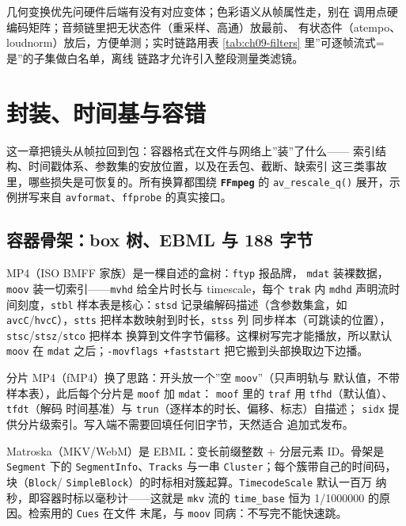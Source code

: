 \documentclass[12pt,a4paper,fontset=fandol]{ctexbook}
\newcommand{\Fn}[1]{\texttt{#1()}}
\newcommand{\Tp}[1]{\texttt{#1}}
\newcommand{\Bk}{\discretionary{}{}{}}
\newcommand{\Lib}[1]{\textbf{\texttt{#1}}}
\begin{document}
\begin{bestpractice}[title={管线选型速查}]
  几何变换优先问硬件后端有没有对应变体；色彩语义从帧属性走，别在
  调用点硬编码矩阵；音频链里把无状态件（重采样、高通）放最前、
  有状态件（atempo、loudnorm）放后，方便单测；实时链路用表
  \ref{tab:ch09-filters} 里''可逐帧流式=是''的子集做白名单，离线
  链路才允许引入整段测量类滤镜。
\end{bestpractice}

\chapter{封装、时间基与容错}
\label{ch:ch10-mux-sync}

这一章把镜头从帧拉回到包：容器格式在文件与网络上''装''了什么——
索引结构、时间戳体系、参数集的安放位置，以及在丢包、截断、缺索引
这三类事故里，哪些损失是可恢复的。所有换算都围绕
\Lib{FFmpeg} 的 \Fn{av\_rescale\_q} 展开，示例拼写来自
\Tp{avformat}、\Tp{ffprobe} 的真实接口。

\section{容器骨架：box 树、EBML 与 188 字节}

MP4（ISO BMFF 家族）是一棵自述的盒树：\Tp{ftyp} 报品牌，
\Tp{mdat} 装裸数据，\Tp{moov} 装一切索引——\Tp{mvhd} 给全片时长与
timescale，每个 \Tp{trak} 内 \Tp{mdhd} 声明流时间刻度，\Tp{stbl}
样本表是核心：\Tp{stsd} 记录编解码描述（含参数集盒，如
\Tp{avcC}/{\Bk}\Tp{hvcC}），\Tp{stts} 把样本数映射到时长，\Tp{stss} 列
同步样本（可跳读的位置），\Tp{stsc}/{\Bk}\Tp{stsz}/{\Bk}\Tp{stco} 把样本
换算到文件字节偏移。这棵树写完才能播放，所以默认 \Tp{moov} 在
\Tp{mdat} 之后；\Tp{-movflags +faststart} 把它搬到头部换取边下边播。

分片 MP4（fMP4）换了思路：开头放一个''空 \Tp{moov}''（只声明轨与
默认值，不带样本表），此后每个分片是 \Tp{moof} 加 \Tp{mdat}：
\Tp{moof} 里的 \Tp{traf} 用 \Tp{tfhd}（默认值）、\Tp{tfdt}（解码
时间基准）与 \Tp{trun}（逐样本的时长、偏移、标志）自描述；
\Tp{sidx} 提供分片级索引。写入端不需要回填任何旧字节，天然适合
追加式发布。

Matroska（MKV/WebM）是 EBML：变长前缀整数 + 分层元素 ID。骨架是
\Tp{Segment} 下的 \Tp{SegmentInfo}、\Tp{Tracks} 与一串
\Tp{Cluster}；每个簇带自己的时间码，块（\Tp{Block}/
\Tp{SimpleBlock}）的时标相对簇起算。\Tp{TimecodeScale} 默认一百万
纳秒，即容器时标以毫秒计——这就是 \Tp{mkv} 流的
\Tp{time\_base} 恒为 1/1000000 的原因。检索用的 \Tp{Cues} 在文件
末尾，与 \Tp{moov} 同病：不写完不能快速跳。
\end{document}
